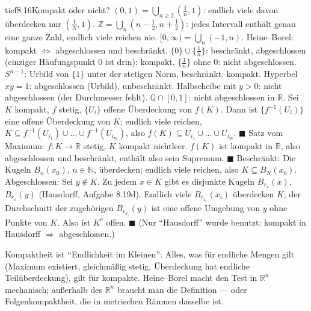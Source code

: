 \begin{loesungkarte}{tief}{8.16}{Kompakt oder nicht?}
$(0, 1) = \bigcup_{n\ge2}(\frac1n, 1)$: endlich viele davon überdecken nur $(\frac1N, 1)$. $\mathbb Z = \bigcup_{n}(n - \frac12, n + \frac12)$: jedes Intervall enthält genau eine ganze Zahl, endlich viele reichen nie. $[0, \infty) = \bigcup_n(-1, n)$.
Heine--Borel: kompakt $\iff$ abgeschlossen und beschränkt. $\{0\}\cup\{\frac1n\}$: beschränkt, abgeschlossen (einziger Häufungspunkt $0$ ist drin): kompakt. $\{\frac1n\}$ ohne $0$: nicht abgeschlossen. $S^{n-1}$: Urbild von $\{1\}$ unter der stetigen Norm, beschränkt: kompakt. Hyperbel $xy = 1$: abgeschlossen (Urbild), unbeschränkt. Halbscheibe mit $y > 0$: nicht abgeschlossen (der Durchmesser fehlt). $\mathbb Q\cap[0, 1]$: nicht abgeschlossen in $\mathbb R$.
Sei $K$ kompakt, $f$ stetig, $\{U_i\}$ offene Überdeckung von $f(K)$. Dann ist $\{f^{-1}(U_i)\}$ eine offene Überdeckung von $K$; endlich viele reichen, $K\subseteq f^{-1}(U_{i_1})\cup\dots\cup f^{-1}(U_{i_m})$, also $f(K)\subseteq U_{i_1}\cup\dots\cup U_{i_m}$. $\blacksquare$ Satz vom Maximum: $f\colon K\to\mathbb R$ stetig, $K$ kompakt nichtleer. $f(K)$ ist kompakt in $\mathbb R$, also abgeschlossen und beschränkt, enthält also sein Supremum. $\blacksquare$
Beschränkt: Die Kugeln $B_n(x_0)$, $n\in\mathbb N$, überdecken; endlich viele reichen, also $K\subseteq B_N(x_0)$. Abgeschlossen: Sei $y\notin K$. Zu jedem $x\in K$ gibt es disjunkte Kugeln $B_{r_x}(x)$, $B_{r_x}(y)$ (Hausdorff, Aufgabe 8.19d). Endlich viele $B_{r_{x_i}}(x_i)$ überdecken $K$; der Durchschnitt der zugehörigen $B_{r_{x_i}}(y)$ ist eine offene Umgebung von $y$ ohne Punkte von $K$. Also ist $K^{c}$ offen. $\blacksquare$ (Nur \enquote{Hausdorff} wurde benutzt: kompakt in Hausdorff $\Rightarrow$ abgeschlossen.)
\begin{mitnehmen}\kastentext
Kompaktheit ist \enquote{Endlichkeit im Kleinen}: Alles, was für endliche Mengen gilt (Maximum existiert, gleichmäßig stetig, Überdeckung hat endliche Teilüberdeckung), gilt für kompakte. Heine--Borel macht den Test in $\mathbb R^{n}$ mechanisch; außerhalb des $\mathbb R^{n}$ braucht man die Definition --- oder Folgenkompaktheit, die in metrischen Räumen dasselbe ist.
\end{mitnehmen}
\end{loesungkarte}

